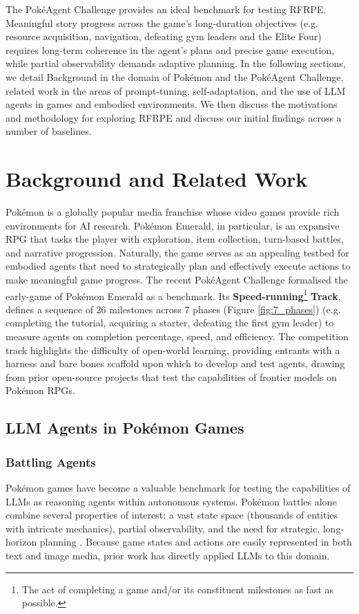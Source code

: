 \documentclass[11pt]{article}
\begin{document}
The PokéAgent Challenge provides an ideal benchmark for testing RFRPE. Meaningful story progress across the game’s long-duration objectives (e.g. resource acquisition, navigation, defeating gym leaders and the Elite Four) requires long-term coherence in the agent’s plans and precise game execution, while partial observability demands adaptive planning.  In the following sections, we detail Background in the domain of Pokémon and the PokéAgent Challenge, related work in the areas of prompt-tuning, self-adaptation, and the use of LLM agents in games and embodied environments. We then discuss the motivations and methodology for exploring RFRPE and discuss our initial findings across a number of baselines.


\section{Background and Related Work}

Pokémon is a globally popular media franchise whose video games provide rich environments for AI research. Pokémon Emerald, in particular, is an expansive RPG that tasks the player with exploration, item collection, turn-based battles, and narrative progression. Naturally, the game serves as an appealing testbed for embodied agents that need to strategically plan and effectively execute actions to make meaningful game progress. The recent PokéAgent Challenge \citep{karten2025challenge} formalised the early-game of Pokémon Emerald as a benchmark. Its \textbf{Speed-running}\footnote{The act of completing a game and/or its constituent milestones as fast as possible.} \textbf{Track}, defines a sequence of 26 milestones across 7 phases (Figure \ref{fig:7_phases}) (e.g. completing the tutorial, acquiring a starter, defeating the first gym leader) to measure agents on completion percentage, speed, and efficiency. The competition track highlights the difficulty of open-world learning, providing entrants with a harness and bare bones scaffold upon which to develop and test agents, drawing from prior open-source projects that test the capabilities of frontier models on Pokémon RPGs.

\subsection{LLM Agents in Pokémon Games}
\subsubsection{Battling Agents}
Pokémon games have become a valuable benchmark for testing the capabilities of LLMs as reasoning agents within autonomous systems. Pokémon battles alone combine several properties of interest: a vast state space (thousands of entities with intricate mechanics), partial observability, and the need for strategic, long-horizon planning \citep{karten2025challenge}. Because game states and actions are easily represented in both text and image media, prior work has directly applied LLMs to this domain.
\end{document}
